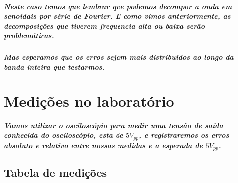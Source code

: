 \documentclass[12pt,twoside, a4paper, twocolumn]{article}
\begin{document}
\subparagraph*{Neste caso temos que lembrar que podemos decompor a onda em senoidais por série de Fourier. E como vimos anteriormente, as decomposições que tiverem frequencia alta ou baixa serão problemáticas.}

\subparagraph*{Mas esperamos que os erros sejam mais distribuídos ao longo da banda inteira que testarmos.}

\section{Medições no laboratório}

\subparagraph*{Vamos utilizar o osciloscópio para medir uma tensão de saída conhecida do osciloscópio, esta de $5 V_{pp}$, e registraremos os erros absoluto e relativo entre nossas medidas e a esperada de $5 V_{pp}$.}

\subsection{Tabela de medições}
\end{document}
